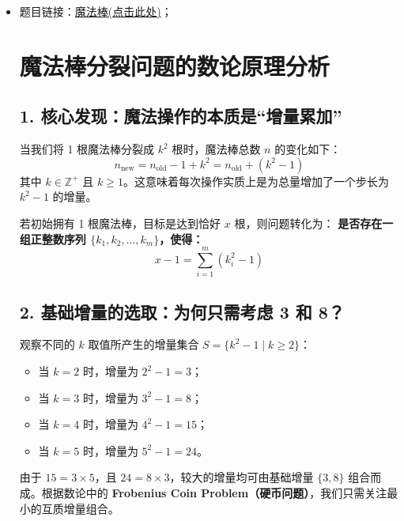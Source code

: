 \begin{itemize}
代码示例：\\
\begin{lstlisting}[language=C++]
int main()
{
	int t; cin >> t;
	while (t--)
	{
		string s; cin >> s;
		int len = s.size();
		for (int i = 1; i < len; i++)
		{
			int a = i;
			//不限制操作次数(或者可以多次连续操作)的问题要记得考虑一下while而不是if.
			while (a > 0 && s[a] - 1 > s[a - 1])
			{
				s[a]--;
				swap(s[a], s[a - 1]);
				a--;
			}
		}
		cout << s << endl;
	}
	return 0;
}

\end{lstlisting}
\subsection{数论总结}
\subsubsection{BGN7 魔法棒}
\item 题目链接：\href{https://www.nowcoder.com/practice/976bd95dda8f4430b512d0c39bd9f106?tpId=385&tags=&title=&difficulty=0&judgeStatus=0&rp=0&sourceUrl=%2Fexam%2Foj%3Fpage%3D1%26tab%3D%25E7%25AE%2597%25E6%25B3%2595%25E5%25AD%25A6%25E4%25B9%25A0%25E7%25AF%2587%26topicId%3D385}{魔法棒(点击此处)}；\\
\section*{魔法棒分裂问题的数论原理分析}

\subsection*{1. 核心发现：魔法操作的本质是“增量累加”}
当我们将 1 根魔法棒分裂成 $k^2$ 根时，魔法棒总数 $n$ 的变化如下：
\[ n_{\text{new}} = n_{\text{old}} - 1 + k^2 = n_{\text{old}} + (k^2 - 1) \]
其中 $k \in \mathbb{Z}^+$ 且 $k \ge 1$。这意味着每次操作实质上是为总量增加了一个步长为 $k^2 - 1$ 的增量。

若初始拥有 1 根魔法棒，目标是达到恰好 $x$ 根，则问题转化为：
\textbf{是否存在一组正整数序列 $\{k_1, k_2, \dots, k_m\}$，使得：}
\[ x - 1 = \sum_{i=1}^{m} (k_i^2 - 1) \]

\subsection*{2. 基础增量的选取：为何只需考虑 3 和 8？}
观察不同的 $k$ 取值所产生的增量集合 $S = \{k^2 - 1 \mid k \ge 2\}$：
\begin{itemize}
	\item 当 $k=2$ 时，增量为 $2^2 - 1 = 3$；
	\item 当 $k=3$ 时，增量为 $3^2 - 1 = 8$；
	\item 当 $k=4$ 时，增量为 $4^2 - 1 = 15$；
	\item 当 $k=5$ 时，增量为 $5^2 - 1 = 24$。
\end{itemize}
由于 $15 = 3 \times 5$，且 $24 = 8 \times 3$，较大的增量均可由基础增量 $\{3, 8\}$ 组合而成。根据数论中的\textbf{ Frobenius Coin Problem（硬币问题）}，我们只需关注最小的互质增量组合。


\end{itemize}
